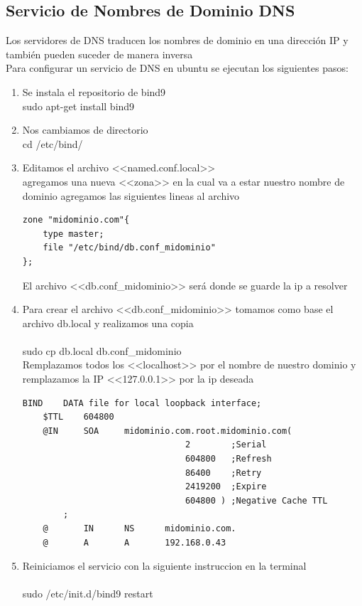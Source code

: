 \subsection{Servicio de Nombres de Dominio DNS}
\noindent
Los servidores de DNS traducen los nombres de dominio en una dirección IP y también pueden suceder de manera inversa\\
Para configurar un servicio de DNS en ubuntu se ejecutan los siguientes pasos:
\begin{enumerate}
    \item Se instala el repositorio de bind9
    \\ sudo apt-get install bind9
    \item Nos cambiamos de directorio
    \\ cd /etc/bind/
    \item Editamos el archivo <<named.conf.local>>\\
    agregamos una nueva <<zona>> en la cual va a estar nuestro nombre de dominio agregamos las siguientes lineas al archivo
    \begin{verbatim}
zone "midominio.com"{
    type master;
    file "/etc/bind/db.conf_midominio"
};
\end{verbatim}
El archivo <<db.conf{\_}midominio>> será donde se guarde la ip a resolver
    \item Para crear el archivo <<db.conf{\_}midominio>> tomamos como base el archivo db.local y realizamos una copia\\
    \\sudo cp db.local db.conf{\_}midominio\\
    Remplazamos todos los <<localhost>> por el nombre de nuestro dominio y remplazamos la IP <<127.0.0.1>> por la ip deseada\\
    \begin{verbatim}
BIND    DATA file for local loopback interface;
    $TTL    604800
    @IN     SOA     midominio.com.root.midominio.com(
                                2        ;Serial
                                604800   ;Refresh
                                86400    ;Retry
                                2419200  ;Expire
                                604800 ) ;Negative Cache TTL
        ;
    @       IN      NS      midominio.com.
    @       A       A       192.168.0.43
\end{verbatim}
    \item Reiniciamos el servicio con la siguiente instruccion en la terminal\\
    \\sudo /etc/init.d/bind9 restart\\

\end{enumerate}
